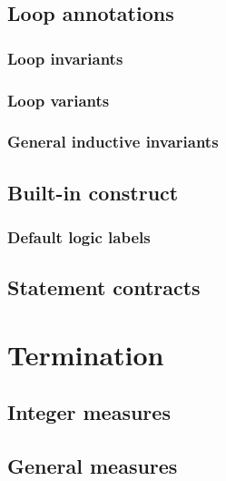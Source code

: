 \subsection{Loop annotations}
\label{sec:loop_annot}

\subsubsection{Loop invariants}

\subsubsection{Loop variants}

\subsubsection{General inductive invariants}

\subsection{Built-in construct \texorpdfstring{\at}{\textbackslash{}at}}
\label{sec:at}

\subsubsection*{Default logic labels}\label{sec:default-logic-labels}

\subsection{Statement contracts}
\label{sec:statement_contract}

\section{Termination}
\label{sec:termination}

\subsection{Integer measures}
\label{sec:integermeasures}

\subsection{General measures}
\label{sec:generalmeasures}

